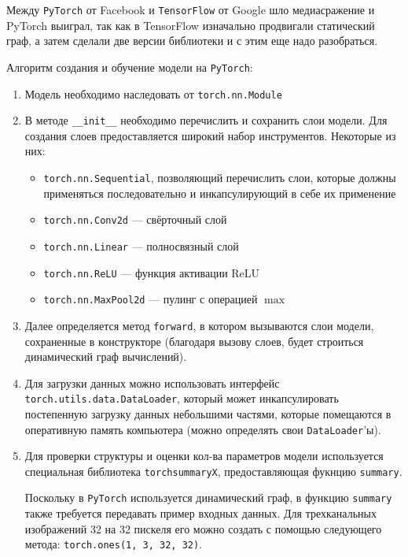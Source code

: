  \begin{remark}
     Между \texttt{PyTorch} от Facebook и \texttt{TensorFlow} от Google шло медиасражение и PyTorch выиграл, так как в TensorFlow изначально продвигали статический граф, а затем сделали две версии библиотеки и с этим еще надо разобраться. 
 \end{remark}

Алгоритм создания и обучение модели на \texttt{PyTorch}:
\begin{enumerate}
    \item Модель необходимо наследовать от \texttt{torch.nn.Module}
    \item В методе \texttt{\_\_init\_\_} необходимо перечислить и сохранить слои модели. Для создания слоев предоставляется широкий набор инструментов. Некоторые из них:
    \begin{itemize}
        \item \texttt{torch.nn.Sequential}, позволяющий перечислить слои, которые должны применяться последовательно и инкапсулирующий в себе их применение
        \item \texttt{torch.nn.Conv2d} --- свёрточный слой
        \item \texttt{torch.nn.Linear} --- полносвязный слой
        \item \texttt{torch.nn.ReLU} --- функция активации ReLU
        \item \texttt{torch.nn.MaxPool2d} --- пулинг с операцией $\max$
    \end{itemize}
    \item Далее определяется метод \texttt{forward}, в котором вызываются слои модели, сохраненные в конструкторе (благодаря вызову слоев, будет строиться динамический граф вычислений).
    \item Для загрузки данных можно использовать интерфейс \texttt{torch.utils.data.DataLoader}, который может инкапсулировать постепенную загрузку данных небольшими частями, которые помещаются в оперативную память компьютера (можно определять свои \texttt{DataLoader}'ы).
    \item Для проверки структуры и оценки кол-ва параметров модели используется специальная библиотека \texttt{torchsummaryX}, предоставляющая фукнцию \texttt{summary}.
    \begin{remark}
        Поскольку в \texttt{PyTorch} используется динамический граф, в функцию \texttt{summary} также требуется передавать пример входных данных. Для трехканальных изображений 32 на 32 пискеля его можно создать с помощью следующего метода: \texttt{torch.ones(1, 3, 32, 32)}.

\end{remark}
\end{enumerate}
